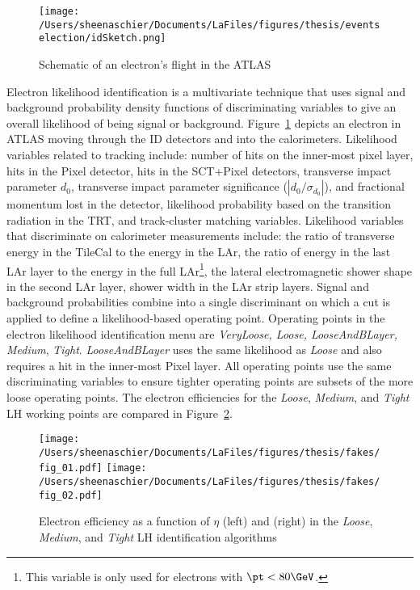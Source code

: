     \begin{figure}[tbp]
       \texttt{[image: /Users/sheenaschier/Documents/LaFiles/figures/thesis/eventselection/idSketch.png]}\\
   \caption{Schematic of an electron's flight in the ATLAS}
   \label{fig:idsketch}
 \end{figure}
Electron likelihood identification is a multivariate technique that uses signal and background probability density functions of discriminating variables to give an overall likelihood of being signal or background.  Figure~\ref{fig:idsketch} depicts an electron in ATLAS moving through the ID detectors and into the calorimeters.  Likelihood variables related to tracking include: number of hits on the inner-most pixel layer, hits in the Pixel detector, hits in the SCT+Pixel detectors, transverse impact parameter $d_0$, transverse impact parameter significance ($|d_0/\sigma_{d_0}|$), and fractional momentum lost in the detector, likelihood probability based on the transition radiation in the TRT, and track-cluster matching variables.  Likelihood variables that discriminate on calorimeter measurements include: the ratio of transverse energy in the TileCal to the energy in the LAr, the ratio of energy in the last LAr layer to the energy in the full LAr\footnote{This variable is only used for electrons with $\pt<80\GeV$.}, the lateral electromagnetic shower shape in the second LAr layer, shower width in the LAr strip layers.  Signal and background probabilities combine into a single discriminant on which a cut is applied to define a likelihood-based operating point.  Operating points in the electron likelihood identification menu are \textit{VeryLoose, Loose, LooseAndBLayer, Medium}, \textit{Tight}.  \textit{LooseAndBLayer} uses the same likelihood as \textit{Loose} and also requires a hit in the inner-most Pixel layer.  All operating points use the same discriminating variables to ensure tighter operating points are subsets of the more loose operating points.  The electron efficiencies for the \textit{Loose}, \textit{Medium}, and \textit{Tight} LH working points are compared in Figure~\ref{fig:lepEff}.
\begin{figure}[h!]
 \centering
 \texttt{[image: /Users/sheenaschier/Documents/LaFiles/figures/thesis/fakes/fig\_01.pdf]}
  \texttt{[image: /Users/sheenaschier/Documents/LaFiles/figures/thesis/fakes/fig\_02.pdf]}
 \caption{Electron efficiency as a function of $\eta$ (left) and \et (right) in the \textit{Loose}, \textit{Medium}, and \textit{Tight} LH identification algorithms}
 \label{fig:lepEff}
 \end{figure}
 
